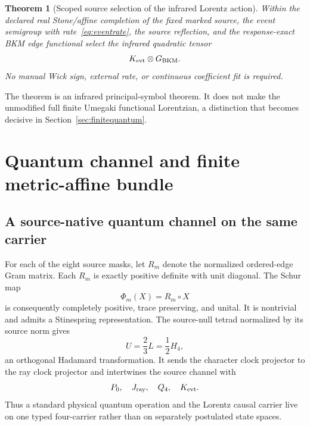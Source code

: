 \documentclass[11pt]{article}
\newtheorem{theorem}{Theorem}[section]
\theoremstyle{definition}
\theoremstyle{remark}
\begin{document}
\begin{theorem}[Scoped source selection of the infrared Lorentz action]\label{thm:iraction}
Within the declared real Stone/affine completion of the fixed marked source, the event semigroup with rate~\eqref{eq:eventrate}, the source reflection, and the response-exact BKM edge functional select the infrared quadratic tensor
\begin{equation}
 K_{\rm evt}\otimes G_{\rm BKM}.
\end{equation}
No manual Wick sign, external rate, or continuous coefficient fit is required.
\end{theorem}

The theorem is an infrared principal-symbol theorem. It does not make the unmodified full finite Umegaki functional Lorentzian, a distinction that becomes decisive in Section~\ref{sec:finitequantum}.

\section{Quantum channel and finite metric-affine bundle}

\subsection{A source-native quantum channel on the same carrier}

For each of the eight source masks, let $R_m$ denote the normalized ordered-edge Gram matrix. Each $R_m$ is exactly positive definite with unit diagonal. The Schur map
\begin{equation}\label{eq:schurchannel}
 \Phi_m(X)=R_m\circ X
\end{equation}
is consequently completely positive, trace preserving, and unital. It is nontrivial and admits a Stinespring representation. The source-null tetrad normalized by its source norm gives
\begin{equation}
 U=\frac23L=\frac12H_4,
\end{equation}
an orthogonal Hadamard transformation. It sends the character clock projector to the ray clock projector and intertwines the source channel with
\begin{equation}
 P_0,\quad J_{\rm ray},\quad Q_4,\quad K_{\rm evt}.
\end{equation}
Thus a standard physical quantum operation and the Lorentz causal carrier live on one typed four-carrier rather than on separately postulated state spaces.
\end{document}
